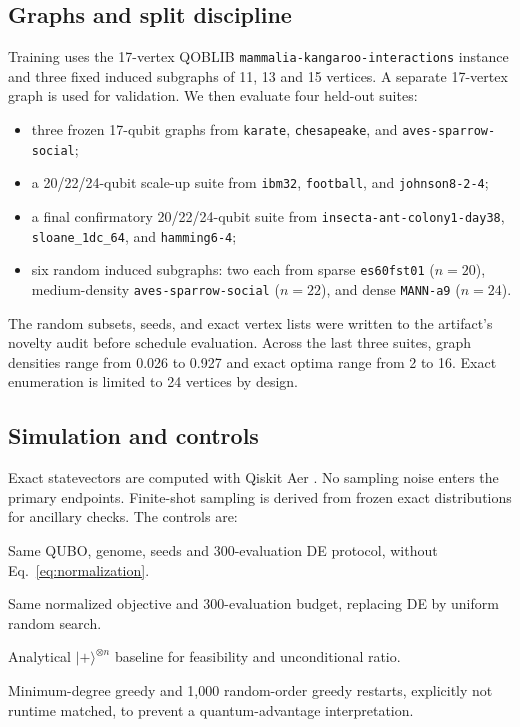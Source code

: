 \documentclass[10pt,twocolumn]{article}
\begin{document}
\subsection{Graphs and split discipline}

Training uses the 17-vertex QOBLIB \texttt{mammalia-kangaroo-interactions} instance and three fixed induced subgraphs of 11, 13 and 15 vertices. A separate 17-vertex graph is used for validation. We then evaluate four held-out suites:

\begin{itemize}[leftmargin=*,nosep]
    \item three frozen 17-qubit graphs from \texttt{karate}, \texttt{chesapeake}, and \texttt{aves-sparrow-social};
    \item a 20/22/24-qubit scale-up suite from \texttt{ibm32}, \texttt{football}, and \texttt{johnson8-2-4};
    \item a final confirmatory 20/22/24-qubit suite from \texttt{insecta-ant-colony1-day38}, \texttt{sloane\_1dc\_64}, and \texttt{hamming6-4};
    \item six random induced subgraphs: two each from sparse \texttt{es60fst01} ($n=20$), medium-density \texttt{aves-sparrow-social} ($n=22$), and dense \texttt{MANN-a9} ($n=24$).
\end{itemize}

The random subsets, seeds, and exact vertex lists were written to the artifact's novelty audit before schedule evaluation. Across the last three suites, graph densities range from 0.026 to 0.927 and exact optima range from 2 to 16. Exact enumeration is limited to 24 vertices by design.

\subsection{Simulation and controls}

Exact statevectors are computed with Qiskit Aer \cite{qiskit2024}. No sampling noise enters the primary endpoints. Finite-shot sampling is derived from frozen exact distributions for ancillary checks. The controls are:

\begin{description}[leftmargin=*,style=nextline,nosep]
    \item[Unnormalized DE.] Same QUBO, genome, seeds and 300-evaluation DE protocol, without Eq.~\eqref{eq:normalization}.
    \item[Normalized random.] Same normalized objective and 300-evaluation budget, replacing DE by uniform random search.
    \item[Uniform state.] Analytical $|+\rangle^{\otimes n}$ baseline for feasibility and unconditional ratio.
    \item[Classical sanity.] Minimum-degree greedy and 1,000 random-order greedy restarts, explicitly not runtime matched, to prevent a quantum-advantage interpretation.
\end{description}
\end{document}
